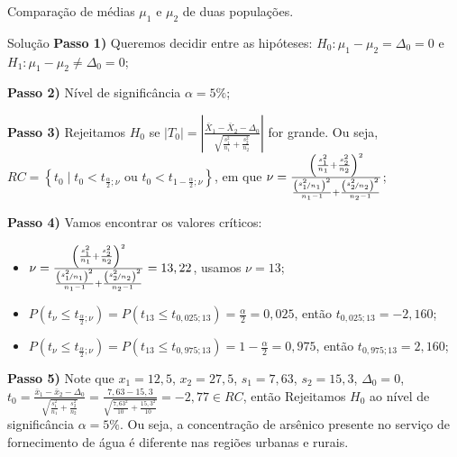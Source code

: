 \documentclass[9pt]{beamer}
\begin{document}
\begin{frame}{Comparação de médias $\mu_1$ e $\mu_2$ de duas populações.}

\scriptsize
\begin{block}{Solução}
	\textbf{Passo 1)} Queremos decidir entre as hipóteses: $H_0: \mu_1 - \mu_2 = \Delta_0=0$ e $H_1: \mu_1 - \mu_2 \neq \Delta_0=0$;
	
	\textbf{Passo 2)} Nível de significância $\alpha=5\%$;
	
	\textbf{Passo 3)} Rejeitamos $H_0$ se $\lvert T_0 \rvert = \left\lvert \frac{\bar{X}_1 - \bar{X}_2 - \Delta_0}{\sqrt{\frac{s_1^2}{n_1} + \frac{s_2^2}{n_2}}} \right\rvert$ for grande. Ou seja, $RC = \left\{ t_0 \mid t_0 < t_{\frac{\alpha}{2}; \nu} \mbox{ ou } t_0 < t_{1-\frac{\alpha}{2};\nu} \right\}$, em que $\nu = \frac{\left(\frac{s_1^2}{n_1} + \frac{s_2^2}{n_2} \right)^2}{\frac{\left(\nicefrac{s_1^2}{n_1}\right)^2}{n_1-1} + \frac{\left(\nicefrac{s_2^2}{n_2}\right)^2}{n_2-1}}$;
	
	\textbf{Passo 4)} Vamos encontrar os valores críticos:
	\begin{itemize}
		\item $\nu = \frac{\left(\frac{s_1^2}{n_1} + \frac{s_2^2}{n_2} \right)^2}{\frac{\left(\nicefrac{s_1^2}{n_1}\right)^2}{n_1-1} + \frac{\left(\nicefrac{s_2^2}{n_2}\right)^2}{n_2-1}} = 13,22$, usamos $\nu=13$;
		\item $P(t_{\nu} \leq t_{\frac{\alpha}{2}; \nu}) = P(t_{13} \leq t_{0,025; 13}) = \frac{\alpha}{2} = 0,025$, então $t_{0,025; 13} = -2,160$;
		\item $P(t_{\nu} \leq t_{\frac{\alpha}{2}; \nu}) = P(t_{13} \leq t_{0,975; 13}) =1- \frac{\alpha}{2} = 0,975$, então $t_{0,975; 13} = 2,160$;
	\end{itemize}

	\textbf{Passo 5)} Note que $x_1=12,5$, $x_2=27,5$, $s_1=7,63$, $s_2=15,3$, $\Delta_0=0$, $t_0 = \frac{\bar{x}_1 - \bar{x}_2 - \Delta_0}{\sqrt{\frac{s_1^2}{n_1} + \frac{s_2^2}{n_2}}} = \frac{7,63 - 15,3}{\sqrt{\frac{7,63^2}{10} + \frac{15,3^2}{10}}}=-2,77 \in RC$, então Rejeitamos $H_0$ ao nível de significância $\alpha=5\%$. Ou seja, a concentração de arsênico presente no serviço de fornecimento de água é diferente nas regiões urbanas e rurais.
\end{block}
\normalsize

\end{frame}
\end{document}

